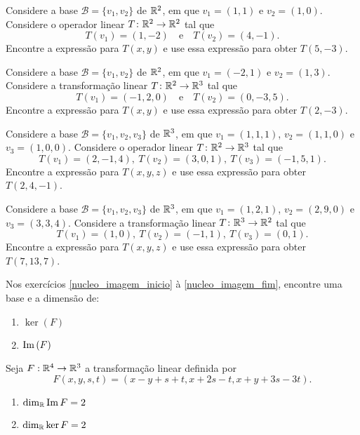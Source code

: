 \documentclass[12pt]{exam}
\begin{document}
\begin{exercicio}
  Considere a base $\mathcal{B} = \{v_1, v_2\}$ de $\mathbb{R}^2$, em que $v_1 = (1, 1)$ e $v_2 = (1, 0)$. Considere o operador linear $T \colon \mathbb{R}^2 \to \mathbb{R}^2$ tal que
  \[
    T(v_1) = (1, -2)\quad \mbox{e} \quad T(v_2) = (4, -1).
  \]
  Encontre a expressão para $T(x, y)$ e use essa expressão para obter $T(5, -3)$.
\end{exercicio}

\begin{exercicio}
  Considere a base $\mathcal{B} = \{v_1, v_2\}$ de $\mathbb{R}^2$, em que $v_1 = (-2, 1)$ e $v_2 = (1, 3)$. Considere a transformação linear $T \colon \mathbb{R}^2 \to \mathbb{R}^3$ tal que
  \[
    T(v_1) = (-1, 2, 0)\quad \mbox{e} \quad T(v_2) = (0, -3, 5).
  \]
  Encontre a expressão para $T(x, y)$ e use essa expressão para obter $T(2, -3)$.
\end{exercicio}

\begin{exercicio}
  Considere a base $\mathcal{B} = \{v_1, v_2, v_3\}$ de $\mathbb{R}^3$, em que $v_1 = (1, 1, 1)$, $v_2 = (1, 1, 0)$ e $v_3 = (1, 0, 0)$. Considere o operador linear $T \colon \mathbb{R}^2 \to \mathbb{R}^3$ tal que
  \[
    T(v_1) = (2, -1, 4),\ T(v_2) = (3, 0, 1),\ T(v_3) = (-1, 5, 1).
  \]
  Encontre a expressão para $T(x, y, z)$ e use essa expressão para obter $T(2, 4, -1)$.
\end{exercicio}

\begin{exercicio}
  Considere a base $\mathcal{B} = \{v_1, v_2, v_3\}$ de $\mathbb{R}^3$, em que $v_1 = (1, 2, 1)$, $v_2 = (2, 9, 0)$ e $v_3 = (3, 3, 4)$. Considere a transformação linear $T \colon \mathbb{R}^3 \to \mathbb{R}^2$ tal que
  \[
    T(v_1) = (1, 0),\ T(v_2) = (-1, 1),\ T(v_3) = (0, 1).
  \]
  Encontre a expressão para $T(x, y, z)$ e use essa expressão para obter $T(7, 13, 7)$.
\end{exercicio}

Nos exercícios \eqref{nucleo_imagem_inicio} à \eqref{nucleo_imagem_fim}, encontre uma base e a dimensão de:
\begin{enumerate}[label={\alph*})]
  \item $\ker(F)$

  \item ${\rm Im\,}(F)$
\end{enumerate}

\begin{exercicio}\label{nucleo_imagem_inicio}
  Seja $F : \mathbb{R}^4 \to \mathbb{R}^3$ a transformação linear definida por
  \[
  F(x,y,s,t) = (x - y + s + t, x + 2s - t, x + y + 3s - 3t).
  \]
  \begin{solucao}
    \begin{enumerate}[label={\alph*})]
      \item $\dim_{\mathbb{R}}{\rm Im\,} F = 2$

      \item $\dim_{\mathbb{R}}\ker F = 2$
    \end{enumerate}
  \end{solucao}
\end{exercicio}
\end{document}
